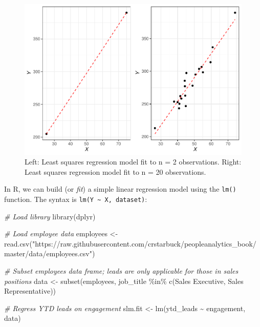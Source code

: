 \documentclass[
]{book}
\newenvironment{Shaded}{\begin{snugshade}}{\end{snugshade}}
\newcommand{\CommentTok}[1]{\textcolor[rgb]{0.56,0.35,0.01}{\textit{#1}}}
\newcommand{\FunctionTok}[1]{\textcolor[rgb]{0.00,0.00,0.00}{#1}}
\newcommand{\NormalTok}[1]{#1}
\newcommand{\OtherTok}[1]{\textcolor[rgb]{0.56,0.35,0.01}{#1}}
\newcommand{\SpecialCharTok}[1]{\textcolor[rgb]{0.00,0.00,0.00}{#1}}
\newcommand{\StringTok}[1]{\textcolor[rgb]{0.31,0.60,0.02}{#1}}
\begin{document}
\begin{figure}

{\centering \includegraphics[width=1\linewidth]{The_Fundamentals_of_People_Analytics_files/figure-latex/lm-fit-compare-1} 

}

\caption{Left: Least squares regression model fit to n = 2 observations. Right: Least squares regression model fit to n = 20 observations.}\label{fig:lm-fit-compare}
\end{figure}

In R, we can build (or \emph{fit}) a simple linear regression model using the \texttt{lm()} function. The syntax is \texttt{lm(Y\ \textasciitilde{}\ X,\ dataset)}:

\begin{Shaded}
\begin{Highlighting}[]
\CommentTok{\# Load library}
\FunctionTok{library}\NormalTok{(dplyr)}

\CommentTok{\# Load employee data}
\NormalTok{employees }\OtherTok{\textless{}{-}} \FunctionTok{read.csv}\NormalTok{(}\StringTok{"https://raw.githubusercontent.com/crstarbuck/peopleanalytics\_book/master/data/employees.csv"}\NormalTok{)}

\CommentTok{\# Subset employees data frame; leads are only applicable for those in sales positions}
\NormalTok{data }\OtherTok{\textless{}{-}} \FunctionTok{subset}\NormalTok{(employees, job\_title }\SpecialCharTok{\%in\%} \FunctionTok{c}\NormalTok{(}\StringTok{\textquotesingle{}Sales Executive\textquotesingle{}}\NormalTok{, }\StringTok{\textquotesingle{}Sales Representative\textquotesingle{}}\NormalTok{))}

\CommentTok{\# Regress YTD leads on engagement}
\NormalTok{slm.fit }\OtherTok{\textless{}{-}} \FunctionTok{lm}\NormalTok{(ytd\_leads }\SpecialCharTok{\textasciitilde{}}\NormalTok{ engagement, data)}
\end{Highlighting}
\end{Shaded}
\end{document}
